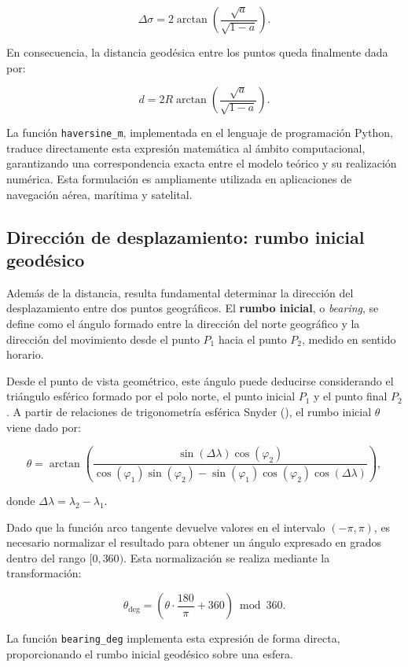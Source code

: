 \documentclass[
  spanish,
  us-letterpaper,
]{scrreprt}
\numberwithin{equation}{section}
\begin{document}
\[
\Delta\sigma = 2 \arctan\left(\frac{\sqrt{a}}{\sqrt{1-a}}\right).
\]

En consecuencia, la distancia geodésica entre los puntos queda
finalmente dada por:

\[
d = 2R \arctan\left(\frac{\sqrt{a}}{\sqrt{1-a}}\right).
\]

La función \texttt{haversine\_m}, implementada en el lenguaje de
programación Python, traduce directamente esta expresión matemática al
ámbito computacional, garantizando una correspondencia exacta entre el
modelo teórico y su realización numérica. Esta formulación es
ampliamente utilizada en aplicaciones de navegación aérea, marítima y
satelital.

\subsection{Dirección de desplazamiento: rumbo inicial
geodésico}\label{direcciuxf3n-de-desplazamiento-rumbo-inicial-geoduxe9sico}

Además de la distancia, resulta fundamental determinar la dirección del
desplazamiento entre dos puntos geográficos. El \textbf{rumbo inicial},
o \emph{bearing}, se define como el ángulo formado entre la dirección
del norte geográfico y la dirección del movimiento desde el punto
\(P_1\) hacia el punto \(P_2\), medido en sentido horario.

Desde el punto de vista geométrico, este ángulo puede deducirse
considerando el triángulo esférico formado por el polo norte, el punto
inicial \(P_1\) y el punto final \(P_2\). A partir de relaciones de
trigonometría esférica Snyder (), el
rumbo inicial \(\theta\) viene dado por:

\[
\theta = \arctan\left(
\frac{
\sin(\Delta\lambda)\cos(\varphi_2)
}{
\cos(\varphi_1)\sin(\varphi_2) - \sin(\varphi_1)\cos(\varphi_2)\cos(\Delta\lambda)
}
\right),
\]

donde \(\Delta\lambda = \lambda_2 - \lambda_1\).

Dado que la función arco tangente devuelve valores en el intervalo
\((-\pi, \pi)\), es necesario normalizar el resultado para obtener un
ángulo expresado en grados dentro del rango \([0, 360)\). Esta
normalización se realiza mediante la transformación:

\[
\theta_{\text{deg}} = \left(\theta \cdot \frac{180}{\pi} + 360\right) \bmod 360.
\]

La función \texttt{bearing\_deg} implementa esta expresión de forma
directa, proporcionando el rumbo inicial geodésico sobre una esfera.
\end{document}
